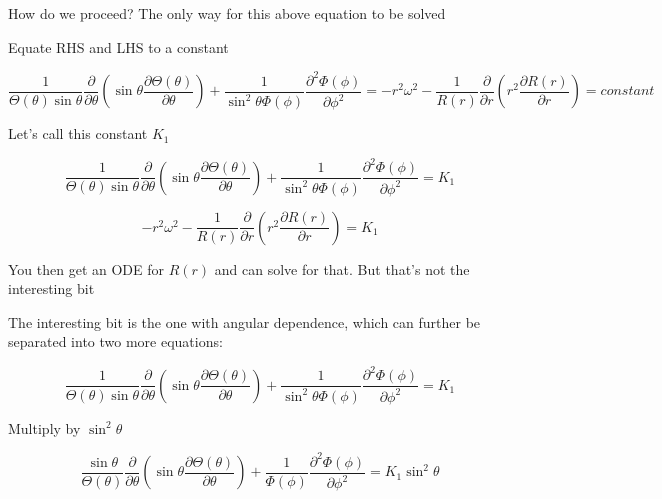 \documentclass[12pt]{article}
\renewcommand{\_}{\kern-1.5pt\textunderscore\kern-1.5pt}
\begin{document}
How do we proceed? The only way for this above equation to be solved\par

Equate RHS and LHS to a constant\par

 \[ \frac{1}{ \Theta  \left(  \theta  \right) \sin  \theta }\frac{ \partial }{ \partial  \theta } \left( \sin  \theta \frac{ \partial  \Theta  \left(  \theta  \right) }{ \partial  \theta } \right) +\frac{1}{\sin ^{2} \theta  \Phi  \left(  \phi  \right) }\frac{ \partial ^{2} \Phi  \left(  \phi  \right) }{ \partial  \phi ^{2}}=-r^{2} \omega ^{2}-\frac{1}{R \left( r \right) }\frac{ \partial }{ \partial r} \left( r^{2}\frac{ \partial R \left( r \right) }{ \partial r} \right) =constant \] \par

Let’s call this constant  \( K_{1} \) \par

 \[ \frac{1}{ \Theta  \left(  \theta  \right) \sin  \theta }\frac{ \partial }{ \partial  \theta } \left( \sin  \theta \frac{ \partial  \Theta  \left(  \theta  \right) }{ \partial  \theta } \right) +\frac{1}{\sin ^{2} \theta  \Phi  \left(  \phi  \right) }\frac{ \partial ^{2} \Phi  \left(  \phi  \right) }{ \partial  \phi ^{2}}=K_{1} \] \par

 \[ -r^{2} \omega ^{2}-\frac{1}{R \left( r \right) }\frac{ \partial }{ \partial r} \left( r^{2}\frac{ \partial R \left( r \right) }{ \partial r} \right) =K_{1} \] \par

You then get an ODE for  \( R \left( r \right)  \)  and can solve for that. But that’s not the interesting bit\par

The interesting bit is the one with angular dependence, which can further be separated into two more equations:\par

 \[ \frac{1}{ \Theta  \left(  \theta  \right) \sin  \theta }\frac{ \partial }{ \partial  \theta } \left( \sin  \theta \frac{ \partial  \Theta  \left(  \theta  \right) }{ \partial  \theta } \right) +\frac{1}{\sin ^{2} \theta  \Phi  \left(  \phi  \right) }\frac{ \partial ^{2} \Phi  \left(  \phi  \right) }{ \partial  \phi ^{2}}=K_{1} \] \par

Multiply by  \( \sin ^{2} \theta  \) \par

 \[ \frac{\sin  \theta }{ \Theta  \left(  \theta  \right) }\frac{ \partial }{ \partial  \theta } \left( \sin  \theta \frac{ \partial  \Theta  \left(  \theta  \right) }{ \partial  \theta } \right) +\frac{1}{ \Phi  \left(  \phi  \right) }\frac{ \partial ^{2} \Phi  \left(  \phi  \right) }{ \partial  \phi ^{2}}=K_{1}\sin ^{2} \theta  \] \par
\end{document}
